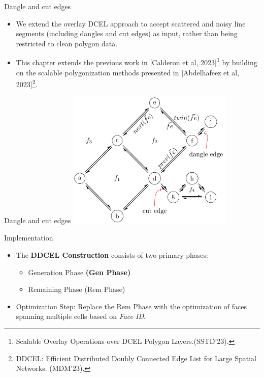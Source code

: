 \begin{frame}{Dangle and cut edges}
    \begin{itemize}
        \item We extend the overlay DCEL approach to accept scattered and noisy line segments (including dangles and cut edges) as input, rather than being restricted to clean polygon data.
        \item This chapter extends the previous work in [Calderon et al, 2023]\footnote{Scalable Overlay Operations over DCEL Polygon Layers.(SSTD'23).} by building on the scalable polygonization methods presented in [Abdelhafeez et al, 2023]\footnote{DDCEL: Efficient Distributed Doubly Connected Edge List for Large Spatial Networks. (MDM'23).}.
    \end{itemize}
\end{frame}

\begin{frame}{Dangle and cut edges}
    \centering
    \includegraphics[width=0.6\textwidth]{../thesis/chapterExtension/dcel_example2}
\end{frame}

\begin{frame}{Implementation}
    \begin{itemize}
        \item The \textbf{DDCEL Construction} consists of two primary phases:
            \begin{itemize}
                \item Generation Phase \textbf{(Gen Phase)} 
                \item Remaining Phase (Rem Phase)
            \end{itemize}
        \item Optimization Step: Replace the Rem Phase with the optimization of faces spanning multiple cells based on \textit{Face ID}.
    \end{itemize}
\end{frame}

